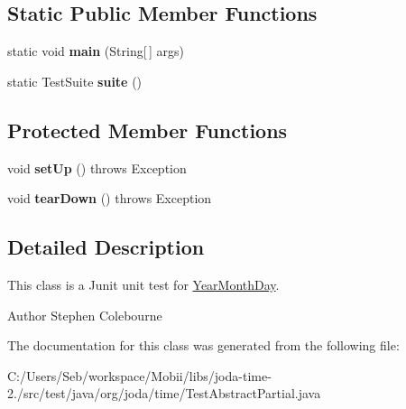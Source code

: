 \subsection*{Static Public Member Functions}
\begin{DoxyCompactItemize}
\item 
\hypertarget{classorg_1_1joda_1_1time_1_1_test_abstract_partial_a713061aa3ae2278d9ce1c8111dfd0a98}{static void {\bfseries main} (String\mbox{[}$\,$\mbox{]} args)}\label{classorg_1_1joda_1_1time_1_1_test_abstract_partial_a713061aa3ae2278d9ce1c8111dfd0a98}

\item 
\hypertarget{classorg_1_1joda_1_1time_1_1_test_abstract_partial_aafc81c7073bb905a24e01802ea8910ca}{static Test\-Suite {\bfseries suite} ()}\label{classorg_1_1joda_1_1time_1_1_test_abstract_partial_aafc81c7073bb905a24e01802ea8910ca}

\end{DoxyCompactItemize}
\subsection*{Protected Member Functions}
\begin{DoxyCompactItemize}
\item 
\hypertarget{classorg_1_1joda_1_1time_1_1_test_abstract_partial_a9c6259290baf2cc50aa5e0aa595b109f}{void {\bfseries set\-Up} ()  throws Exception }\label{classorg_1_1joda_1_1time_1_1_test_abstract_partial_a9c6259290baf2cc50aa5e0aa595b109f}

\item 
\hypertarget{classorg_1_1joda_1_1time_1_1_test_abstract_partial_a0f560b617d1dc1e77ec198e9197c0419}{void {\bfseries tear\-Down} ()  throws Exception }\label{classorg_1_1joda_1_1time_1_1_test_abstract_partial_a0f560b617d1dc1e77ec198e9197c0419}

\end{DoxyCompactItemize}


\subsection{Detailed Description}
This class is a Junit unit test for \hyperlink{classorg_1_1joda_1_1time_1_1_year_month_day}{Year\-Month\-Day}.

\begin{DoxyAuthor}{Author}
Stephen Colebourne 
\end{DoxyAuthor}


The documentation for this class was generated from the following file\-:\begin{DoxyCompactItemize}
\item 
C\-:/\-Users/\-Seb/workspace/\-Mobii/libs/joda-\/time-\/2./src/test/java/org/joda/time/Test\-Abstract\-Partial.\-java\end{DoxyCompactItemize}
